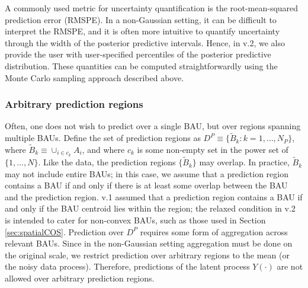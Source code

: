 \documentclass[article]{jss}
\newcommand{\red}[1]{\textcolor{red}{#1}}
\def\mbf#1{{%
\mathchoice%
{\hbox{\boldmath$\displaystyle{#1}$}}%
{\hbox{\boldmath$\textstyle{#1}$}}%
{\hbox{\boldmath$\scriptstyle{#1}$}}%
{\hbox{\boldmath$\scriptscriptstyle{#1}$}}%
}}
\def\vec{\mbf}
\newcommand{\ECurly}[1]{\mathbb{E}\left\{#1\right\}} %
\begin{document}
 

A commonly used metric for uncertainty quantification is the root-mean-squared prediction error (RMSPE). 
In a non-Gaussian setting, it can be difficult to interpret the RMSPE, and it is often more intuitive to quantify uncertainty through the width of the posterior predictive intervals. Hence, in  v.2, we also provide the user with user-specified percentiles of the posterior predictive distribution. 
 These quantities can be computed straightforwardly using the Monte Carlo sampling approach described above. 



\subsubsection{Arbitrary prediction regions}


Often, one does not wish to predict over a single BAU, but over regions spanning multiple BAUs.
Define the set of prediction regions as 
$D^P \equiv \{\tilde{B}_k : k = 1, \dots, N_P\}$, where $\tilde{B}_k \equiv \cup_{i\in c_k} A_i$, and where $c_k$ is some non-empty set in the power set of $\{1, \dots, N\}$. 
Like the data, the prediction regions $\{\tilde{B}_k\}$ may overlap.  
In practice, $\tilde{B}_k$  may not include entire BAUs; in this case, we assume that a prediction region contains a BAU if and only if there is at least some overlap between the BAU and the prediction region.
 v.1 assumed that a prediction region contains a BAU if and only if the BAU centroid lies within the region; the relaxed condition in  v.2 is intended to cater for non-convex BAUs, such as those used in Section \ref{sec:spatialCOS}.
Prediction over $D^P$ requires some form of aggregation across relevant BAUs.
Since in the non-Gaussian setting aggregation must be done on the original scale, we restrict prediction over arbitrary regions to the mean (or the noisy data process).  
Therefore, predictions of the latent process $Y(\cdot)$ are not allowed over arbitrary prediction regions.
\end{document}
